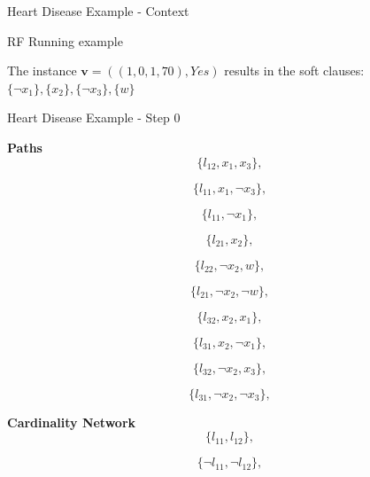 \begin{frame}{Heart Disease Example - Context}
\begin{block}{RF Running example}
\begin{center}
\begin{center}
\begin{minipage}{0.265\linewidth}
            \end{minipage}
        \end{center}
        The instance $\textbf{v} = ((1,0,1,70), Yes)$ results in the soft clauses: $\{\lnot x_{1}\},\{ x_{2}\},\{ \lnot x_{3}\},\{ w\}$
        \vspace{2pt}
        \end{center}
    \end{block}
\end{frame}



\begin{frame}{Heart Disease Example - Step 0}
    \centering
    \fontsize{8pt}{1pt}\selectfont 
    \linespread{0.6}
    \begin{minipage}[t]{0.22\textwidth}
        \begin{block}{\centering \fontsize{8.5pt}{0pt}\selectfont \textbf{Paths}}
            \linespread{0.1}
            \[\{l_{12} , x_{1} , x_{3}\},\]
            \linespread{0.2}
            
            \[\{l_{11} , x_{1} , \lnot x_{3}\},\]
            
            \[\{l_{11} , \lnot x_{1}\},\]
            
            \[\{l_{21} , x_{2}\},\]
            
            \[\{l_{22} , \lnot x_{2}  , w\},\]
            
            \[\{l_{21} , \lnot x_{2}  , \lnot w\},\]
            
            \[\{l_{32} , x_{2} , x_{1}\},\]
            
            \[\{l_{31} , x_{2} , \lnot x_{1}\},\]
            
            \[\{l_{32} , \lnot x_{2} , x_{3}\},\]
            
            \[\{l_{31} , \lnot x_{2} , \lnot x_{3}\},\]
            \vspace{2pt}
        \end{block}
    \end{minipage}
    \hspace{0.05\textwidth}
    \begin{minipage}[t]{0.19\textwidth}
        \begin{block}{\centering \fontsize{8.5pt}{2pt}\selectfont \textbf{Cardinality Network}}
            \linespread{0.3}
            \[\{l_{11} , l_{12}\},\]
            
            \[\{\lnot l_{11} , \lnot l_{12}\},\]
            

\end{block}
\end{minipage}
\end{frame}
